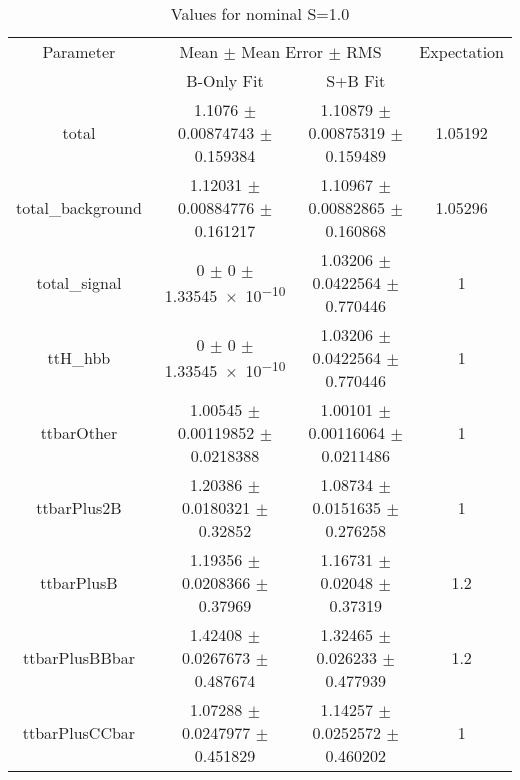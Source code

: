 \begin{table}
\centering
\caption{Values for nominal S=1.0}
\begin{tabular}{cccc}
\toprule
Parameter & \multicolumn{2}{c}{Mean $\pm$ Mean Error $\pm$ RMS} & Expectation\\
 & B-Only Fit & S+B Fit & \\
\midrule
total & \num{1.1076} $\pm$ \num{0.00874743} $\pm$ \num{0.159384} & \num{1.10879} $\pm$ \num{0.00875319} $\pm$ \num{0.159489} & \num{1.05192}\\
total\_background & \num{1.12031} $\pm$ \num{0.00884776} $\pm$ \num{0.161217} & \num{1.10967} $\pm$ \num{0.00882865} $\pm$ \num{0.160868} & \num{1.05296}\\
total\_signal & \num{0} $\pm$ \num{0} $\pm$ \num{1.33545e-10} & \num{1.03206} $\pm$ \num{0.0422564} $\pm$ \num{0.770446} & \num{1}\\
ttH\_hbb & \num{0} $\pm$ \num{0} $\pm$ \num{1.33545e-10} & \num{1.03206} $\pm$ \num{0.0422564} $\pm$ \num{0.770446} & \num{1}\\
ttbarOther & \num{1.00545} $\pm$ \num{0.00119852} $\pm$ \num{0.0218388} & \num{1.00101} $\pm$ \num{0.00116064} $\pm$ \num{0.0211486} & \num{1}\\
ttbarPlus2B & \num{1.20386} $\pm$ \num{0.0180321} $\pm$ \num{0.32852} & \num{1.08734} $\pm$ \num{0.0151635} $\pm$ \num{0.276258} & \num{1}\\
ttbarPlusB & \num{1.19356} $\pm$ \num{0.0208366} $\pm$ \num{0.37969} & \num{1.16731} $\pm$ \num{0.02048} $\pm$ \num{0.37319} & \num{1.2}\\
ttbarPlusBBbar & \num{1.42408} $\pm$ \num{0.0267673} $\pm$ \num{0.487674} & \num{1.32465} $\pm$ \num{0.026233} $\pm$ \num{0.477939} & \num{1.2}\\
ttbarPlusCCbar & \num{1.07288} $\pm$ \num{0.0247977} $\pm$ \num{0.451829} & \num{1.14257} $\pm$ \num{0.0252572} $\pm$ \num{0.460202} & \num{1}\\
\bottomrule
\end{tabular}
\end{table}